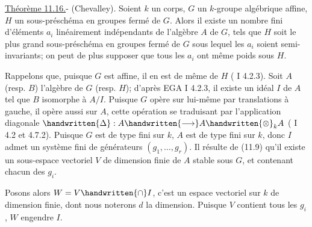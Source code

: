 
\uline{Théorème 11.16.}- (Chevalley). Soient $k$ un corps, $G$ un $k$-groupe algébrique affine, $H$ un sous-préschéma en groupes fermé de $G$. Alors il existe un nombre fini d'éléments $a_i$ linéairement indépendants de l'algèbre $A$ de $G$, tels que $H$ soit le plus grand sous-préschéma en groupes fermé de $G$ sous lequel les $a_i$ soient semi-invariants; on peut de plus supposer que tous les $a_i$ ont même  poids\deleted{)} sous $H$.

Rappelons que, puisque $G$ est affine, il en est de même de $H$ ( I 4.2.3). Soit $A$ (resp. $B$) l'algèbre de $G$ (resp. $H$); d'après EGA I 4.2.3, il existe un idéal $I$ de $A$ tel que $B$  isomorphe à $A/I$. Puisque $G$ opère sur lui-même par translations à gauche, il opère aussi sur $A$, cette opération se traduisant par l'application diagonale $\handwritten{\Delta}:A\handwritten{\longrightarrow}A\handwritten{\otimes}_k A$ ( I 4.2 et 4.7.2). Puisque $G$ est de type fini sur $k$, $A$ est de type fini sur $k$, donc $I$  admet un système fini de générateurs $(g_1,\ldots,g_r)$. Il résulte de (11.9) qu'il existe un sous-espace vectoriel $V$ de dimension finie de $A$  stable sous $G$, et contenant chacun des $g_i$.

Posons alors $W=V\handwritten{\cap}I$, c'est un espace vectoriel sur $k$ de dimension finie, dont nous noterons $d$ la dimension. Puisque $V$ contient tous les $g_i$, $W$ engendre  $I$.

